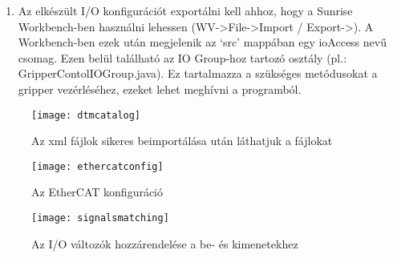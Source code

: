 \documentclass[../documentation.tex]{subfiles}
\begin{document}
\begin{enumerate}
	\begin{itemize}
		\item OpenGripper: bool, output, digital
		\item CloseGripper: bool, output, digital
		\item Status: bool, input, digital
	\end{itemize}
Az egyes változókat a kívánt bemenetekkel és kimenetekkel  módszerrel lehet összerendelni (\ref{fig:signalsmatching}). Megfelelő összekötés esetén a változók mellletti szürke nyilak zölddé változnak.
	\item Az elkészült I/O konfigurációt exportálni kell ahhoz, hogy a Sunrise Workbench-ben használni lehessen (WV->File->Import / Export->). A Workbench-ben ezek után megjelenik az `src' mappában egy ioAccess nevű csomag. Ezen belül található az IO Group-hoz tartozó osztály (pl.: GripperContolIOGroup.java). Ez tartalmazza a szükséges metódusokat a gripper vezérléséhez, ezeket lehet meghívni a programból.
\end{enumerate}

\begin{figure}[h]
\centering
\texttt{[image: dtmcatalog]}
\caption{Az xml fájlok sikeres beimportálása után láthatjuk a  fájlokat}
\label{fig:dtmcatalog}
\end{figure}

\begin{figure}[h]
\centering
\texttt{[image: ethercatconfig]}
\caption{Az EtherCAT konfiguráció}
\label{fig:ethercatconfig}
\end{figure}

\begin{figure}[h]
\centering
\texttt{[image: signalsmatching]}
\caption{Az I/O változók hozzárendelése a be- és kimenetekhez}
\label{fig:signalsmatching}
\end{figure}

\end{document}
